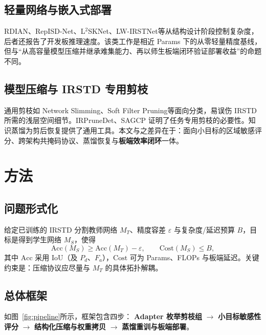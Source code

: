 \documentclass[lettersize,journal]{IEEEtran}
\begin{document}
\subsection{轻量网络与嵌入式部署}
RDIAN\cite{RDIAN2023}、RepISD-Net\cite{RepISDNet2023}、L$^2$SKNet\cite{L2SKNet2025}、LW-IRSTNet\cite{LWIRSTNet2023}等从结构设计阶段控制复杂度，后者还报告了开发板推理速度。该类工作是相近 Params 下的从零轻量精度基线，但与“从高容量模型压缩并继承难集能力、再以师生板端闭环验证部署收益”的命题不同。

\subsection{模型压缩与 IRSTD 专用剪枝}
通用剪枝如 Network Slimming\cite{NetworkSlimming2017}、Soft Filter Pruning\cite{SoftFilterPruning2018}等面向分类，易误伤 IRSTD 所需的浅层空间细节。IRPruneDet\cite{IRPruneDet2024}、SAGCP\cite{SAGCP2025} 证明了任务专用剪枝的必要性。知识蒸馏\cite{HintonDistill2015}为剪后恢复提供了通用工具。本文与之差异在于：面向小目标的区域敏感评分、跨架构共掩码协议、蒸馏恢复与\textbf{板端效率闭环}一体。

\section{方法}
\label{sec:method}

\subsection{问题形式化}
\label{sec:problem}
给定已训练的 IRSTD 分割教师网络 $M_T$、精度容差 $\varepsilon$ 与复杂度/延迟预算 $B$，目标是得到学生网络 $M_S$，使得
\begin{equation}
\label{eq:obj}
\mathrm{Acc}(M_S)\ge \mathrm{Acc}(M_T)-\varepsilon,\qquad
\mathrm{Cost}(M_S)\le B,
\end{equation}
其中 $\mathrm{Acc}$ 采用 IoU（及 $P_d$、$F_a$），$\mathrm{Cost}$ 可为 Params、FLOPs 与板端延迟。关键约束是：压缩协议应尽量与 $M_T$ 的具体拓扑解耦。

\subsection{总体框架}
\label{sec:overview}
如图~\ref{fig:pipeline}所示，框架包含四步：
\textbf{Adapter 枚举剪枝组} $\rightarrow$
\textbf{小目标敏感性评分} $\rightarrow$
\textbf{结构化压缩与权重拷贝} $\rightarrow$
\textbf{蒸馏重训与板端部署}。
\end{document}
